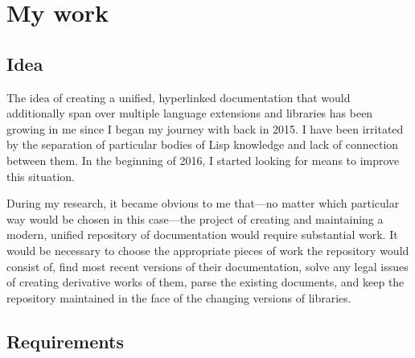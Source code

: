 \section{My work}

\subsection{Idea}

The idea of creating a unified, hyperlinked \cl{} documentation that would additionally span over multiple language extensions and libraries has been growing in me since I began my journey with \cl{} back in 2015. I have been irritated by the separation of particular bodies of Lisp knowledge and lack of connection between them. In the beginning of 2016, I started looking for means to improve this situation.

During my research, it became obvious to me that---no matter which particular way would be chosen in this case---the project of creating and maintaining a modern, unified repository of \cl{} documentation would require substantial work. It would be necessary to choose the appropriate pieces of work the repository would consist of, find most recent versions of their documentation, solve any legal issues of creating derivative works of them, parse the existing documents, and keep the repository maintained in the face of the changing versions of \cl{} libraries.

\subsection{Requirements} \label{requirements}

